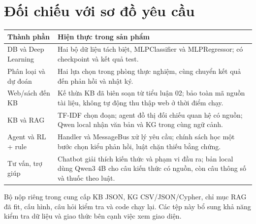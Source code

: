 \section{Đối chiếu với sơ đồ yêu cầu}
\begin{longtable}{p{4cm}p{10cm}}\toprule Thành phần & Hiện thực trong sản phẩm\\\midrule
DB và Deep Learning & Hai bộ dữ liệu tách biệt, MLPClassifier và MLPRegressor; có checkpoint và kết quả test.\\
Phân loại và dự đoán & Hai lựa chọn trong phòng thực nghiệm, cùng chuyển kết quả đến phản hồi và nhật ký.\\
Web/sách đến KB & Kế thừa KB đã biên soạn từ tiểu luận 02; bảo toàn mã nguồn tài liệu, không tự động thu thập web ở thời điểm chạy.\\
KB và RAG & TF-IDF chọn đoạn; agent đồ thị đối chiếu quan hệ có nguồn; Qwen local nhận văn bản và KG trong cùng ngữ cảnh.\\
Agent và RL + rule & Handler và MessageBus xử lý yêu cầu; chính sách học một bước chọn kiểu phản hồi, luật chặn thiếu bằng chứng.\\
Tư vấn, trợ giúp & Chatbot giải thích kiến thức và phạm vi đầu ra; bản local dùng Qwen3 4B cho câu kiến thức có nguồn, còn câu thông số và thuốc theo luật.\\\bottomrule\end{longtable}

Bộ nộp riêng trong  cung cấp KB JSON, KG CSV/JSON/Cypher, chỉ mục RAG đã fit, cấu hình, câu hỏi kiểm tra và code chạy lại. Các tệp này bổ sung khả năng kiểm tra dữ liệu và giao thức bên cạnh việc xem giao diện.
